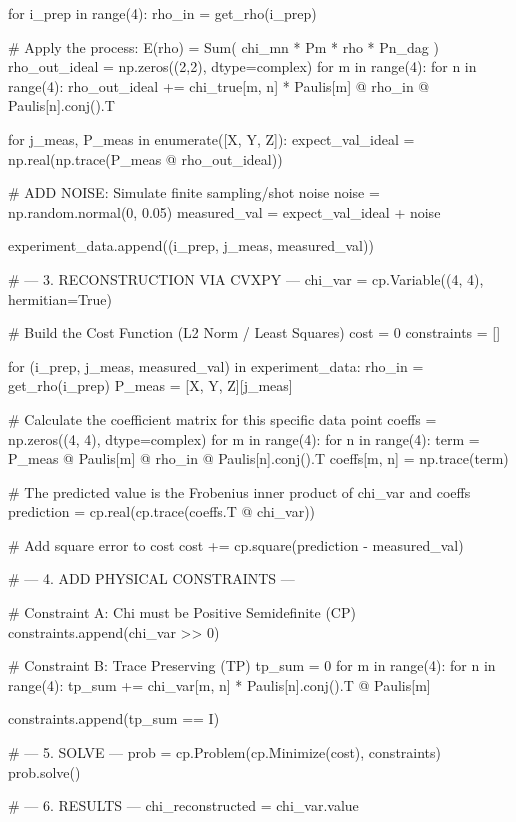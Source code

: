 for i_prep in range(4):
    rho_in = get_rho(i_prep)
    
    # Apply the process: E(rho) = Sum( chi_mn * Pm * rho * Pn_dag )
    rho_out_ideal = np.zeros((2,2), dtype=complex)
    for m in range(4):
        for n in range(4):
            rho_out_ideal += chi_true[m, n] * Paulis[m] @ rho_in @ Paulis[n].conj().T
            
    for j_meas, P_meas in enumerate([X, Y, Z]):
        expect_val_ideal = np.real(np.trace(P_meas @ rho_out_ideal))
        
        # ADD NOISE: Simulate finite sampling/shot noise
        noise = np.random.normal(0, 0.05) 
        measured_val = expect_val_ideal + noise
        
        experiment_data.append((i_prep, j_meas, measured_val))


# --- 3. RECONSTRUCTION VIA CVXPY ---
chi_var = cp.Variable((4, 4), hermitian=True)

# Build the Cost Function (L2 Norm / Least Squares)
cost = 0
constraints = []

for (i_prep, j_meas, measured_val) in experiment_data:
    rho_in = get_rho(i_prep)
    P_meas = [X, Y, Z][j_meas]
    
    # Calculate the coefficient matrix for this specific data point
    coeffs = np.zeros((4, 4), dtype=complex)
    for m in range(4):
        for n in range(4):
            term = P_meas @ Paulis[m] @ rho_in @ Paulis[n].conj().T
            coeffs[m, n] = np.trace(term)
            
    # The predicted value is the Frobenius inner product of chi_var and coeffs
    prediction = cp.real(cp.trace(coeffs.T @ chi_var))
    
    # Add square error to cost
    cost += cp.square(prediction - measured_val)

# --- 4. ADD PHYSICAL CONSTRAINTS ---

# Constraint A: Chi must be Positive Semidefinite (CP)
constraints.append(chi_var >> 0)

# Constraint B: Trace Preserving (TP)
tp_sum = 0
for m in range(4):
    for n in range(4):
        tp_sum += chi_var[m, n] * Paulis[n].conj().T @ Paulis[m]

constraints.append(tp_sum == I)

# --- 5. SOLVE ---
prob = cp.Problem(cp.Minimize(cost), constraints)
prob.solve()

# --- 6. RESULTS ---
chi_reconstructed = chi_var.value

